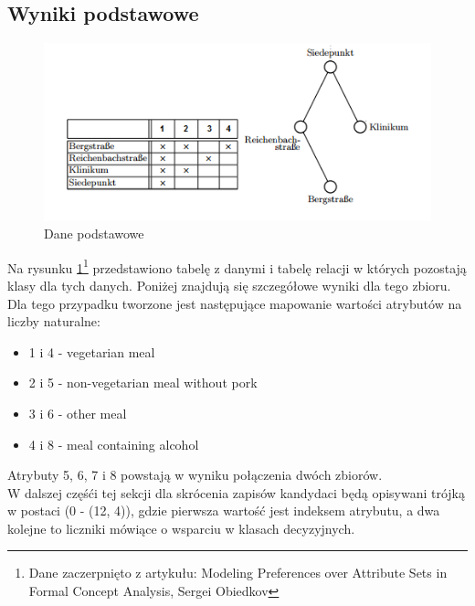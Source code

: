 \documentclass[a4paper,12pt]{article}
\begin{document}
\subsection{Wyniki podstawowe}

\begin{figure}[h!]
\begin{center}
\includegraphics[width=\textwidth]{img/dane.png}
\caption{Dane podstawowe}
\label{dane_podstawowe}
\end{center}
\end{figure}

Na rysunku \ref{dane_podstawowe}\footnote{Dane zaczerpnięto z artykułu: Modeling Preferences over Attribute Sets in
Formal Concept Analysis, Sergei Obiedkov} przedstawiono tabelę z danymi i tabelę relacji w których pozostają klasy dla tych danych. Poniżej znajdują się szczegółowe wyniki dla tego zbioru.\\

Dla tego przypadku tworzone jest następujące mapowanie wartości atrybutów na liczby naturalne:\\

\begin{itemize}
\item 1 i 4 - vegetarian meal
\item 2 i 5 - non-vegetarian meal without pork
\item 3 i 6 - other meal
\item 4 i 8 - meal containing alcohol
\end{itemize}

Atrybuty 5, 6, 7 i 8 powstają w wyniku połączenia dwóch zbiorów.\\

W dalszej częśći tej sekcji dla skrócenia zapisów kandydaci będą opisywani trójką w postaci (0 - (12, 4)), gdzie pierwsza wartość jest indeksem atrybutu, a dwa kolejne to liczniki mówiące o wsparciu w klasach decyzyjnych.
\end{document}
